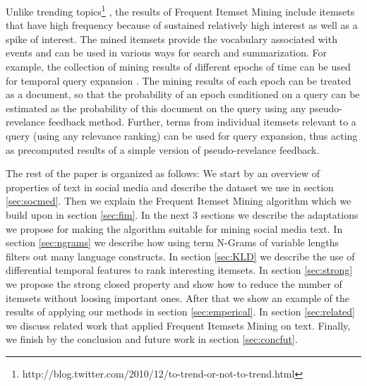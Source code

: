 \documentclass{sig-alternate}
\begin{document}
Unlike trending topics\footnote{http://blog.twitter.com/2010/12/to-trend-or-not-to-trend.html}  \cite{mathioudakis2010twittermonitor}, the results of Frequent Itemset Mining include itemsets that have high frequency because of sustained relatively high interest as well as a spike of interest. 
The mined itemsets provide the vocabulary associated with events and can be used in various ways for search and summarization. For example, the collection of mining results of different epochs of time can be used for temporal query expansion \cite{choi2012temporal}. The mining results of each epoch can be treated as a document, so that the probability of an epoch conditioned on a query can be estimated as the probability of this document on the query using any pseudo-revelance feedback method. Further, terms from individual itemsets relevant to a query (using any relevance ranking) can be used for query expansion, thus acting as precomputed results of a simple version of pseudo-revelance feedback. 

The rest of the paper is organized as follows: We start by an overview of properties of text in social media and describe the dataset we use in section \ref{sec:socmed}. Then we explain the Frequent Itemset Mining algorithm which we build upon in section \ref{sec:fim}. 
In the next 3 sections we describe the adaptations we propose for making the algorithm suitable for mining social media text. In section \ref{sec:ngrams} we describe how using term N-Grams of variable lengths filters out many language constructs. In section \ref{sec:KLD} we describe the use of differential temporal features to rank interesting itemsets. In section \ref{sec:strong} we propose the strong closed property and show how to reduce the number of itemsets without loosing important ones. After that we show an example of the results of applying our methods in section \ref{sec:emperical}. In section \ref{sec:related} we discuss related work that applied Frequent Itemsets Mining on text. Finally, we finish by the conclusion and future work in section \ref{sec:concfut}.
\end{document}
